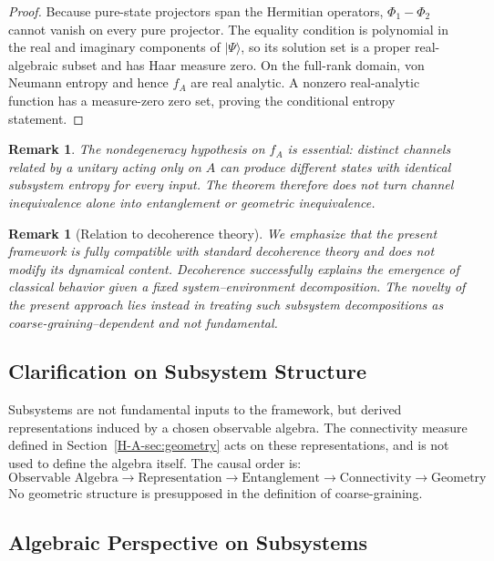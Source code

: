 \documentclass[12pt,a4paper,openany]{book}
\newtheorem{remark}[theorem]{Remark}
\begin{document}
\begin{proof}
Because pure-state projectors span the Hermitian operators, $\Phi_1-\Phi_2$ cannot vanish on every pure projector.  The equality condition is polynomial in the real and imaginary components of $|\Psi\rangle$, so its solution set is a proper real-algebraic subset and has Haar measure zero.  On the full-rank domain, von Neumann entropy and hence $f_A$ are real analytic.  A nonzero real-analytic function has a measure-zero zero set, proving the conditional entropy statement.
\end{proof}

\begin{remark}
The nondegeneracy hypothesis on $f_A$ is essential: distinct channels related by a unitary acting only on $A$ can produce different states with identical subsystem entropy for every input.  The theorem therefore does not turn channel inequivalence alone into entanglement or geometric inequivalence.
\end{remark}

\begin{remark}[Relation to decoherence theory]
We emphasize that the present framework is fully compatible with standard decoherence theory and does not modify its dynamical content. 
Decoherence successfully explains the emergence of classical behavior given a fixed system--environment decomposition. 
The novelty of the present approach lies instead in treating such subsystem decompositions as coarse-graining--dependent and not fundamental.
\end{remark}

\subsection{Clarification on Subsystem Structure}

Subsystems are not fundamental inputs to the framework, but derived representations induced by a chosen observable algebra. 
The connectivity measure defined in Section~\ref{H-A-sec:geometry} acts on these representations, and is not used to define the algebra itself. 
The causal order is:
\[
\text{Observable Algebra} \to \text{Representation} \to \text{Entanglement} \to \text{Connectivity} \to \text{Geometry}
\]
No geometric structure is presupposed in the definition of coarse-graining.

\subsection{Algebraic Perspective on Subsystems}
\end{document}
